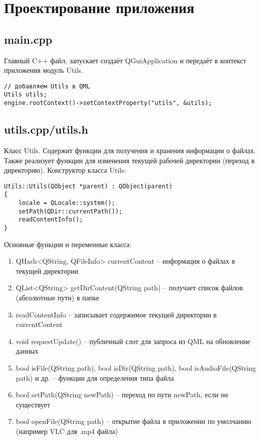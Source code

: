 \documentclass[a4paper,12pt]{article}
\begin{document}

\section{Проектирование приложения}
\subsection{main.cpp}
Главный C++ файл, запускает создаёт QGuiApplication и передаёт в контекст приложения модуль Utils.
\begin{verbatim}
// добавляем Utils в QML
Utils utils;
engine.rootContext()->setContextProperty("utils", &utils);
\end{verbatim}
\subsection{utils.cpp/utils.h}
Класс Utils. Содержит функции для получения и хранения информации о файлах. Также реализует функции для изменения текущей рабочей директории (переход в директорию). Конструктор класса Utils:
\begin{verbatim}
Utils::Utils(QObject *parent) : QObject(parent)
{
    locale = QLocale::system();
    setPath(QDir::currentPath());
    readContentInfo();
}
\end{verbatim}
Основные функции и переменные класса:
\begin{enumerate}
    \item QHash<QString, QFileInfo> currentContent -- информация о файлах в текущей директории
    \item QList<QString> getDirContent(QString path) -- получает список файлов (абсолютные пути) в папке
    \item readContentInfo -- записывает содержимое текущей директории в currentContent
    \item void requestUpdate() -- публичный слот для запроса из QML на обновление данных
    \item bool isFile(QString path), bool isDir(QString path), bool isAudioFile(QString path) и др. -- функции для определения типа файла
    \item bool setPath(QString newPath) -- переход по пути newPath, если он существует
    \item bool openFile(QString path) -- открытие файла в приложении по умолчанию (например VLC для .mp4 файла)
\end{enumerate}
\end{document}

